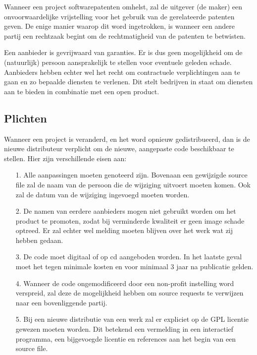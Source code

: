 Wanneer een project softwarepatenten omhelst, zal de uitgever (de maker) een onvoorwaardelijke vrijstelling voor het gebruik van de gerelateerde patenten geven. De enige manier waarop dit word ingetrokken, is wanneer een andere partij een rechtzaak begint om de rechtmatigheid van de patenten te betwisten. 

Een aanbieder is gevrijwaard van garanties. Er is dus geen mogelijkheid om de (natuurlijk) persoon aansprakelijk te stellen voor eventuele geleden schade. Aanbieders hebben echter wel het recht om contractuele verplichtingen aan te gaan en zo bepaalde diensten te verlenen. Dit stelt bedrijven in staat om diensten aan te bieden in combinatie met een open product. 

\subsection{Plichten}
Wanneer een project is veranderd, en het word opnieuw gedistribueerd, dan is de nieuwe distributeur verplicht om de nieuwe, aangepaste code beschikbaar te stellen. Hier zijn verschillende eisen aan:
\begin{itemize}
  \item[1.] Alle aanpassingen moeten genoteerd zijn. Bovenaan een gewijzigde source file zal de naam van de persoon die de wijziging uitvoert moeten komen. Ook zal de datum van de wijziging ingevoegd moeten worden.%
  \item[2.] De namen van eerdere aanbieders mogen niet gebruikt worden om het product te promoten, zodat bij verminderde kwaliteit er geen image schade optreed. Er zal echter wel melding moeten blijven over het werk wat zij hebben gedaan. 
  \item[3.] De code moet digitaal of op cd aangeboden worden. In het laatste geval moet het tegen minimale kosten en voor minimaal 3 jaar na publicatie gelden. 
  \item[4.] Wanneer de code ongemodificeerd door een non-profit instelling word verspreid, zal deze de mogelijkheid hebben om source requests te verwijzen naar een bovenliggende partij. 
  \item[5.] Bij een nieuwe distributie van een werk zal er expliciet op de GPL licentie gewezen moeten worden. Dit betekend een vermelding in een interactief programma, een bijgevoegde licentie en references aan het begin van een source file.
\end{itemize}

